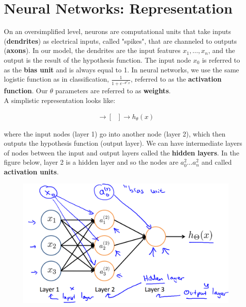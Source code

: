 \section{Neural Networks: Representation}
    On an oversimplified level, neurons are computational units that take inputs (\textbf{dendrites}) as
    electrical inputs, called "spikes", that are channeled to outputs (\textbf{axons}). In our model,
    the dendrites are the input features $x_1,\dots, x_n$, and the output is the result of the hypothesis
    function. The input node $x_0$ is referred to as the \textbf{bias unit} and is always equal to 1. In
    neural networks, we use the same logistic function as in classification, $\frac{1}{1+e^{-\theta^T x}}$,
    referred to as the \textbf{activation function}. Our $\theta$ parameters are referred to as
    \textbf{weights}. \\

    \noindent A simplistic representation looks like:

    \begin{align*}
    [x_0 x_1 x_2]
        \to [\text{ }] \to h_{\theta}(x)
    \end{align*}

    \noindent where the input nodes (layer 1) go into another node (layer 2), which then outputs the
    hypothesis function (output layer). We can have intermediate layers of nodes between the input and
    output layers called the \textbf{hidden layers}. In the figure below, layer 2 is a hidden layer and so
    the nodes are $a^2_0\dots a^2_n$ and called \textbf{activation units}.

    \begin{figure}[hbt!]
        \centering
        \includegraphics[scale=0.5]{Resources/Neural_Net}
    \end{figure}


